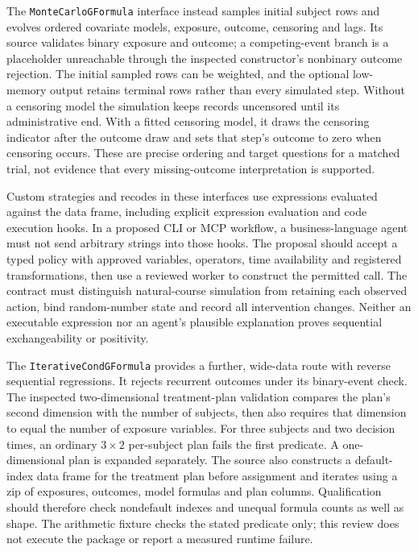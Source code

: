 The \texttt{MonteCarloGFormula} interface instead samples initial subject rows
and evolves ordered covariate models, exposure, outcome, censoring and lags.
Its source validates binary exposure and outcome; a competing-event branch
is a placeholder unreachable through the inspected constructor's nonbinary
outcome rejection. The initial sampled rows can be weighted, and the optional
low-memory output retains terminal rows rather than every simulated step.
Without a censoring model the simulation keeps records uncensored until its
administrative end. With a fitted censoring model, it draws the censoring
indicator after the outcome draw and sets that step's outcome to zero when
censoring occurs. These are precise ordering and target questions for a
matched trial, not evidence that every missing-outcome interpretation is
supported.\citep{exec24_longpy_zepid_source}

Custom strategies and recodes in these interfaces use expressions evaluated
against the data frame, including explicit expression evaluation and code
execution hooks. In a proposed CLI or MCP workflow, a business-language agent
must not send arbitrary strings into those hooks. The proposal should accept
a typed policy with approved variables, operators, time availability and
registered transformations, then use a reviewed worker to construct the
permitted call. The contract must distinguish natural-course simulation from
retaining each observed action, bind random-number state and record all
intervention changes. Neither an executable expression nor an agent's
plausible explanation proves sequential exchangeability or positivity.
\citep{exec24_longpy_zepid_source}

The \texttt{IterativeCondGFormula} provides a further, wide-data route with
reverse sequential regressions. It rejects recurrent outcomes under its
binary-event check. The inspected two-dimensional treatment-plan validation
compares the plan's second dimension with the number of subjects, then also
requires that dimension to equal the number of exposure variables. For three
subjects and two decision times, an ordinary $3\times2$ per-subject plan
fails the first predicate. A one-dimensional plan is expanded separately.
The source also constructs a default-index data frame for the treatment plan
before assignment and iterates using a zip of exposures, outcomes, model
formulas and plan columns. Qualification should therefore check nondefault
indexes and unequal formula counts as well as shape. The arithmetic fixture
checks the stated predicate only; this review does not execute the package
or report a measured runtime failure.\citep{exec24_longpy_zepid_source,exec24_longpy_reference}

